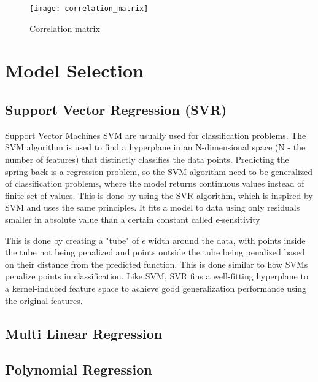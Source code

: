 \begin{figure}[H]
    \centering
    \texttt{[image: correlation\_matrix]}
    \caption{Correlation matrix}
    \label{fig:correlation_matrix}
\end{figure}


\section{Model Selection}\label{sec:model-selection}

\subsection{Support Vector Regression (SVR)}\label{subsec:support-vector-regression-(svr)}
Support Vector Machines \ac{SVM} are usually used for classification problems. The \ac{SVM} algorithm is used to find
a hyperplane in an N-dimensional space (N - the number of features) that distinctly classifies the data points.
\cite[p. 42]{awad_efficientlearningmachines_2015}
Predicting the spring back is a regression problem, so the \ac{SVM} algorithm need to be generalized of
classification problems, where the model returns continuous values instead of finite set of values.
This is done by using the \ac{SVR} algorithm, which is inspired by  \ac{SVM} and uses the same principles.
It fits a model to data using only residuals smaller in absolute value than a certain constant called
$\epsilon$-sensitivity

This is done by creating a "tube" of $\epsilon$ width around the data, with points inside the tube not being
penalized and points outside the tube being penalized based on their distance from the predicted function.
This is done similar to how \ac{SVM}s penalize points in classification.
Like \ac{SVM}, \ac{SVR} fins a well-fitting hyperplane to a kernel-induced feature space to achieve good
generalization performance using the original features.
\cite[p. 369]{montesinoslopez_supportvectormachines_2022}

\subsection{Multi Linear Regression}\label{subsec:multi-linear-regression}

\subsection{Polynomial Regression}\label{subsec:polynomial-regression}

